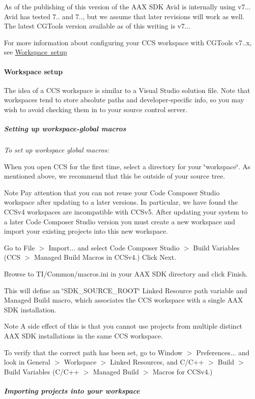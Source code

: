 \begin{DoxyEnumerate}
As of the publishing of this version of the A\+AX S\+DK Avid is internally using v7... Avid has tested 7.. and 7.., but we assume that later revisions will work as well. The latest C\+G\+Tools version available as of this writing is v7...

For more information about configuring your C\+CS workspace with C\+G\+Tools v7..\+x, see \mbox{\hyperlink{a00832_subsubsection__workspace_setup_}{Workspace setup}} 
\end{DoxyEnumerate}

\hypertarget{a00832_subsubsection__workspace_setup_}{}\paragraph{Workspace setup}\label{a00832_subsubsection__workspace_setup_}
 The idea of a C\+CS workspace is similar to a Visual Studio solution file. Note that workspaces tend to store absolute paths and developer-\/specific info, so you may wish to avoid checking them in to your source control server. \subparagraph*{Setting up workspace-\/global macros }

 {\itshape  To set up workspace global macros\+: } 
\begin{DoxyEnumerate}
\item When you open C\+CS for the first time, select a directory for your \char`\"{}workspace\char`\"{}. As mentioned above, we recommend that this be outside of your source tree.  \begin{DoxyNote}{Note}
Pay attention that you can not reuse your Code Composer Studio workspace after updating to a later versions. In particular, we have found the C\+C\+Sv4 workspaces are incompatible with C\+C\+Sv5. After updating your system to a later Code Composer Studio version you must create a new workspace and import your existing projects into this new workspace. 
\end{DoxyNote}

\item Go to File $>$ Import... and select Code Composer Studio $>$ Build Variables (C\+CS $>$ Managed Build Macros in C\+C\+Sv4.) Click Next.  
\item Browse to T\+I/\+Common/macros.\+ini in your A\+AX S\+DK directory and click Finish.  
\item This will define an \char`\"{}\+S\+D\+K\+\_\+\+S\+O\+U\+R\+C\+E\+\_\+\+R\+O\+O\+T\char`\"{} Linked Resource path variable and Managed Build macro, which associates the C\+CS workspace with a single A\+AX S\+DK installation. \begin{DoxyNote}{Note}
A side effect of this is that you cannot use projects from multiple distinct A\+AX S\+DK installations in the same C\+CS workspace.  
\end{DoxyNote}

\item To verify that the correct path has been set, go to Window $>$ Preferences... and look in General $>$ Workspace $>$ Linked Resources, and C/\+C++ $>$ Build $>$ Build Variables (C/\+C++ $>$ Managed Build $>$ Macros for C\+C\+Sv4.) 
\end{DoxyEnumerate}\subparagraph*{Importing projects into your workspace }

